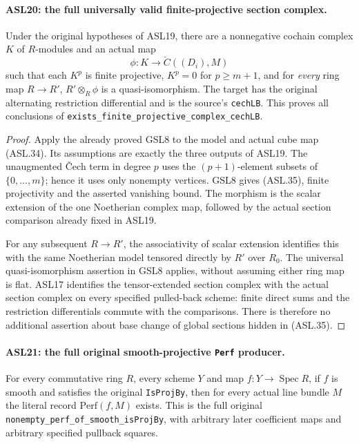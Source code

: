 \paragraph{ASL20: the full universally valid finite-projective section complex.}
\label{claim:ASL20}
Under the original hypotheses of ASL19, there are a
nonnegative cochain complex $K$ of $R$-modules and an actual
map
\[
                 \phi:K\longrightarrow\check C((D_i),M)
                                                        \tag{ASL.35}
\]
such that each $K^p$ is finite projective, $K^p=0$ for
$p\ge m+1$, and for \emph{every} ring map $R\to R'$,
$R'\otimes_R\phi$ is a quasi-isomorphism.  The target has
the original alternating restriction differential and is the
source's \texttt{cech\allowbreak{}LB}.  This proves all conclusions of
\texttt{exists\_\allowbreak{}finite\_\allowbreak{}projective\_\allowbreak{}complex\_\allowbreak{}cech\allowbreak{}LB}.

\begin{proof}
Apply the already proved GSL8 to the model and actual cube
map (ASL.34).  Its assumptions are exactly the three
outputs of ASL19.  The unaugmented \v Cech term in degree
$p$ uses the $(p+1)$-element subsets of
$\{0,\ldots,m\}$; hence it uses only nonempty vertices.
GSL8 gives (ASL.35), finite projectivity and the asserted
vanishing bound.  The morphism is the scalar extension of
the one Noetherian complex map, followed by the actual
section comparison already fixed in ASL19.

For any subsequent $R\to R'$, the associativity of scalar
extension identifies this with the same Noetherian model
tensored directly by $R'$ over $R_0$.  The universal
quasi-isomorphism assertion in GSL8 applies, without assuming
either ring map is flat.  ASL17 identifies the tensor-extended
section complex with the actual section complex on every
specified pulled-back scheme: finite direct sums and the
restriction differentials commute with the comparisons.
There is therefore no additional assertion about base change
of global sections hidden in (ASL.35).
\end{proof}

\paragraph{ASL21: the full original smooth-projective \texttt{Perf} producer.}
\label{claim:ASL21}
For every commutative ring $R$, every scheme $Y$ and map
$f:Y\to\operatorname{Spec}R$, if $f$ is smooth and satisfies
the original \texttt{Is\allowbreak{}Proj\allowbreak{}By}, then for every actual line
bundle $M$ the literal record $\mathrm{Perf}(f,M)$ exists.
This is the full original
\texttt{nonempty\_\allowbreak{}perf\_\allowbreak{}of\_\allowbreak{}smooth\_\allowbreak{}is\allowbreak{}Proj\allowbreak{}By}, with arbitrary
later coefficient maps and arbitrary specified pullback squares.

